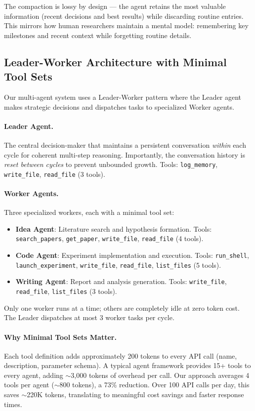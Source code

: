 The compaction is lossy by design --- the agent retains the most valuable information (recent decisions and best results) while discarding routine entries. This mirrors how human researchers maintain a mental model: remembering key milestones and recent context while forgetting routine details.

\subsection{Leader-Worker Architecture with Minimal Tool Sets}
\label{sec:agents}

Our multi-agent system uses a Leader-Worker pattern where the Leader agent makes strategic decisions and dispatches tasks to specialized Worker agents.

\paragraph{Leader Agent.} The central decision-maker that maintains a persistent conversation \textit{within} each cycle for coherent multi-step reasoning. Importantly, the conversation history is \textit{reset between cycles} to prevent unbounded growth. Tools: \texttt{log\_memory}, \texttt{write\_file}, \texttt{read\_file} (3 tools).

\paragraph{Worker Agents.} Three specialized workers, each with a minimal tool set:
\begin{itemize}[nosep]
    \item \textbf{Idea Agent}: Literature search and hypothesis formation. Tools: \texttt{search\_papers}, \texttt{get\_paper}, \texttt{write\_file}, \texttt{read\_file} (4 tools).
    \item \textbf{Code Agent}: Experiment implementation and execution. Tools: \texttt{run\_shell}, \texttt{launch\_experiment}, \texttt{write\_file}, \texttt{read\_file}, \texttt{list\_files} (5 tools).
    \item \textbf{Writing Agent}: Report and analysis generation. Tools: \texttt{write\_file}, \texttt{read\_file}, \texttt{list\_files} (3 tools).
\end{itemize}

Only one worker runs at a time; others are completely idle at zero token cost. The Leader dispatches at most 3 worker tasks per cycle.

\paragraph{Why Minimal Tool Sets Matter.} Each tool definition adds approximately 200 tokens to every API call (name, description, parameter schema). A typical agent framework provides 15+ tools to every agent, adding $\sim$3,000 tokens of overhead per call. Our approach averages 4 tools per agent ($\sim$800 tokens), a 73\% reduction. Over 100 API calls per day, this saves $\sim$220K tokens, translating to meaningful cost savings and faster response times.

